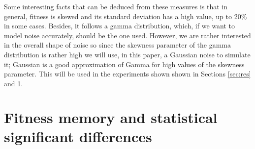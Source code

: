 \documentclass{llncs}
\begin{document}
Some interesting facts that can be deduced from these measures is that
in general, fitness is skewed and its standard deviation has a high
value, up to 20\% in some cases. Besides, it
follows a gamma distribution, which, if we want to model noise
accurately, should be the one used. However, we are rather interested
in the overall shape of noise so since the skewness parameter of the gamma
distribution is rather high we will use, in this paper, a Gaussian
noise to simulate it; Gaussian is a good approximation of Gamma for
high values of the skewness parameter. This will be used in the experiments shown
shown  in Sections \ref{sec:res} and \ref{sec:wilcoxon}.

\section{Fitness memory and statistical significant differences}
\label{sec:wilcoxon}
\end{document}
